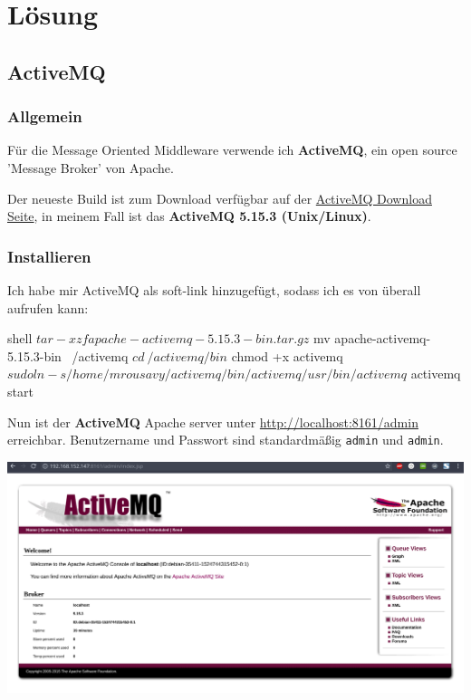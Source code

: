 
\section{Lösung}

\subsection{ActiveMQ}

\subsubsection{Allgemein}

Für die Message Oriented Middleware verwende ich \textbf{ActiveMQ}, ein open source 'Message Broker' von Apache.

Der neueste Build ist zum Download verfügbar auf der \href{http://activemq.apache.org/download.html}{ActiveMQ Download Seite}, in meinem Fall ist das \textbf{ActiveMQ 5.15.3 (Unix/Linux)}.

\subsubsection{Installieren}

Ich habe mir ActiveMQ als soft-link hinzugefügt, sodass ich es von überall aufrufen kann:

\begin{code}{shell}
$ tar -xzf apache-activemq-5.15.3-bin.tar.gz
$ mv apache-activemq-5.15.3-bin ~/activemq
$ cd ~/activemq/bin
$ chmod +x activemq
$ sudo ln -s /home/mrousavy/activemq/bin/activemq /usr/bin/activemq
$ activemq start
\end{code}

Nun ist der \textbf{ActiveMQ} Apache server unter \url{http://localhost:8161/admin} erreichbar. Benutzername und Passwort sind standardmäßig \texttt{admin} und \texttt{admin}.

\includegraphics[width=\textwidth]{images/activemq-home}

